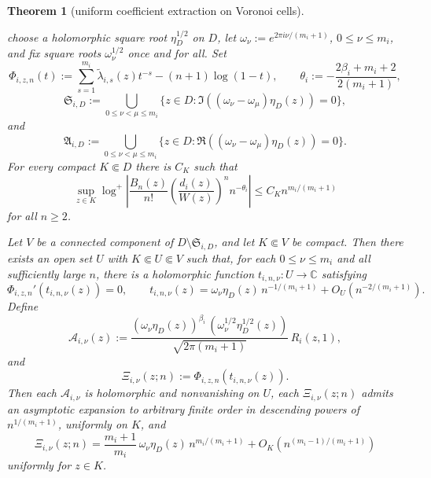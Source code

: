 \documentclass[reqno]{article}
\newtheorem{theorem}{Theorem}
\theoremstyle{definition}
\theoremstyle{remark}
\theoremstyle{plain}
\newcommand{\C}{\mathbb C}
\begin{document}
\begin{theorem}[uniform coefficient extraction on Voronoi cells]
\begin{enumerate}
choose a holomorphic square root $\eta_D^{1/2}$ on $D$, let $\omega_\nu:=e^{2\pi i\nu/(m_i+1)}$, $0\le\nu\le m_i$, and fix square roots $\omega_\nu^{1/2}$ once and for all. Set
$$\Phi_{i,z,n}(t):=\sum_{s=1}^{m_i}\widetilde\lambda_{i,s}(z)t^{-s}-(n+1)\log(1-t),\qquad
\theta_i:=-\frac{2\beta_i+m_i+2}{2(m_i+1)},$$
\begin{equation}\label{eq:local-stokes-sets}
\mathfrak S_{i,D}:=\bigcup_{0\le\nu<\mu\le m_i}
\{z\in D:\Im((\omega_\nu-\omega_\mu)\eta_D(z))=0\},
\end{equation}
and
\begin{equation}\label{eq:local-antistokes-sets}
\mathfrak A_{i,D}:=\bigcup_{0\le\nu<\mu\le m_i}
\{z\in D:\Re((\omega_\nu-\omega_\mu)\eta_D(z))=0\}.
\end{equation}
For every compact $K\Subset D$ there is $C_K$ such that
\begin{equation}\label{eq:essential-normalized-upper}
\sup_{z\in K}\log^+\left|
\frac{B_n(z)}{n!}\left(\frac{d_i(z)}{W(z)}\right)^n n^{-\theta_i}
\right|\le C_K n^{m_i/(m_i+1)}
\end{equation}
for all $n\ge2$.

Let $V$ be a connected component of $D\setminus\mathfrak S_{i,D}$, and let $K\Subset V$ be compact. Then there exists an open set $U$ with $K\Subset U\Subset V$ such that, for each $0\le\nu\le m_i$ and all sufficiently large $n$, there is a holomorphic function $t_{i,n,\nu}:U\to\C$ satisfying
$$\Phi_{i,z,n}'(t_{i,n,\nu}(z))=0,\qquad
t_{i,n,\nu}(z)=\omega_\nu\eta_D(z)\,n^{-1/(m_i+1)}+O_U\!\left(n^{-2/(m_i+1)}\right).$$
Define
\begin{equation}\label{eq:Ai-local-unified}
\mathcal A_{i,\nu}(z):=
\frac{(\omega_\nu\eta_D(z))^{\beta_i}\,(\omega_\nu^{1/2}\eta_D^{1/2}(z))}{\sqrt{2\pi(m_i+1)}}\,R_i(z,1),
\end{equation}
and
\begin{equation}\label{eq:Xi-local-unified}
\Xi_{i,\nu}(z;n):=\Phi_{i,z,n}(t_{i,n,\nu}(z)).
\end{equation}
Then each $\mathcal A_{i,\nu}$ is holomorphic and nonvanishing on $U$, each $\Xi_{i,\nu}(z;n)$ admits an asymptotic expansion to arbitrary finite order in descending powers of $n^{1/(m_i+1)}$, uniformly on $K$, and
\begin{equation}\label{eq:Xi-local-unified-leading}
\Xi_{i,\nu}(z;n)=\frac{m_i+1}{m_i}\,\omega_\nu\eta_D(z)\,n^{m_i/(m_i+1)}
+O_K\!\left(n^{(m_i-1)/(m_i+1)}\right)
\end{equation}
uniformly for $z\in K$.


\end{enumerate}
\end{theorem}
\end{document}
